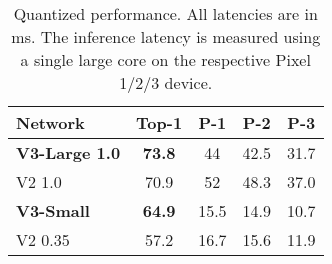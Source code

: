 \documentclass[10pt,twocolumn,letterpaper]{article}
\begin{document}
\begin{table}[t]
\centering
\vspace{0pt}
\caption{Floating point performance on the Pixel family of phones (P- denotes a Pixel- phone). All latencies are in ms and are measured using a single large core with a batch size of one. Top-1 accuracy is on ImageNet.}
\label{table:float-latencies}
\end{table}


\begin{table}[t]
\centering
\vspace{0pt}
\begin{tabular}{l|c|c|c|c}
\toprule[0.2em]
Network        & Top-1 & P-1 & P-2 & P-3 \\
\hline
\textbf{V3-Large 1.0} & \textbf{73.8}   & 44     &  42.5 & 31.7\\ 
 V2 1.0                & 70.9           & 52     &  48.3 & 37.0  \\
\hline
 \textbf{V3-Small}     & \textbf{64.9}  & 15.5   & 14.9 & 10.7\\
 V2 0.35               & 57.2           & 16.7   & 15.6 & 11.9 \\
\hline
\toprule[0.2em]
\end{tabular}
\caption{Quantized performance. All latencies are in ms. The inference latency is measured using a single large core on the respective Pixel 1/2/3 device.}
\label{table:quantized-latencies}
\end{table}
\end{document}
